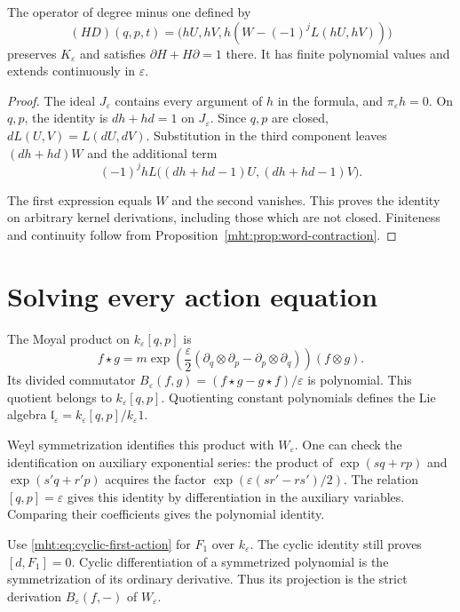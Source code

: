 \begin{lemma}\label{mht:lem:derivation-contraction}
The operator of degree minus one defined by
\begin{equation}\label{mht:eq:derivation-kernel-homotopy}
 (HD)(q,p,t)
 =\bigl(hU,hV,h(W-(-1)^jL(hU,hV))\bigr)
\end{equation}
preserves $K_\varepsilon$ and satisfies
$\partial H+H\partial=1$ there. It has finite polynomial values
and extends continuously in $\varepsilon$.
\end{lemma}

\begin{proof}
The ideal $J_\varepsilon$ contains every argument of $h$ in the
formula, and $\pi_\varepsilon h=0$. On $q,p$, the identity is
$dh+hd=1$ on $J_\varepsilon$. Since $q,p$ are closed,
$dL(U,V)=L(dU,dV)$. Substitution in the third component leaves
$(dh+hd)W$ and the additional term
\[
 (-1)^j hL\bigl((dh+hd-1)U,(dh+hd-1)V\bigr).
\]

The first expression equals $W$ and the second vanishes. This
proves the identity on arbitrary kernel derivations, including
those which are not closed. Finiteness and continuity follow
from Proposition~\ref{mht:prop:word-contraction}.
\end{proof}

\section{Solving every action equation}

The Moyal product on $k_\varepsilon[q,p]$ is
\[
 f\star g
 =m\exp\!\left(\frac{\varepsilon}{2}
   (\partial_q\otimes\partial_p-\partial_p\otimes\partial_q)
   \right)(f\otimes g).
\]
Its divided commutator
$B_\varepsilon(f,g)=(f\star g-g\star f)/\varepsilon$
is polynomial. This quotient belongs to $k_\varepsilon[q,p]$.
Quotienting
constant polynomials defines the Lie algebra
$\mathfrak l_\varepsilon=k_\varepsilon[q,p]/k_\varepsilon1$.

Weyl symmetrization identifies this product with $W_\varepsilon$.
One can check the identification on auxiliary exponential series:
the product of $\exp(sq+rp)$ and $\exp(s'q+r'p)$ acquires the
factor $\exp(\varepsilon(sr'-rs')/2)$. The relation
$[q,p]=\varepsilon$ gives this identity by differentiation in
the auxiliary variables. Comparing their coefficients gives
the polynomial identity.

Use \eqref{mht:eq:cyclic-first-action} for $F_1$ over
$k_\varepsilon$. The cyclic identity still proves $[d,F_1]=0$.
Cyclic differentiation of a symmetrized polynomial is the
symmetrization of its ordinary derivative. Thus its projection
is the strict derivation $B_\varepsilon(f,-)$ of $W_\varepsilon$.

